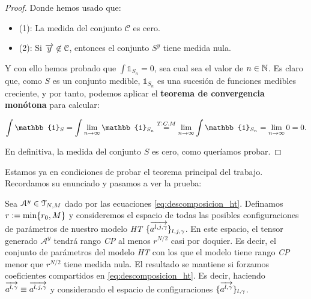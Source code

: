 \begin{proof}
    Donde hemos usado que:

    \begin{itemize}
        \item (1): La medida del conjunto $\mathcal{C}$ es cero.
        \item (2): Si $\overrightarrow{y} \not\in \mathcal{C}$, entonces el conjunto $S^{y}$ tiene medida nula.
    \end{itemize}

    Y con ello hemos probado que $\int \mathbb{1}_{S_n} = 0$, sea cual sea el valor de $n \in \mathbb{N}$. Es claro que, como $S$ es un conjunto medible, $\mathbb{1}_{S_n}$ es una sucesión de funciones medibles creciente, y por tanto, podemos aplicar el \textbf{teorema de convergencia monótona} para calcular:

    \begin{equation}
        \int \mathbb{1}_S = \int \lim_{n \to \infty} \mathbb{1}_{S_n} \encima{=}{T.C.M} \lim_{n \to \infty} \int \mathbb{1}_{S_n} = \lim_{n \to \infty} 0 = 0.
    \end{equation}

    En definitiva, la medida del conjunto $S$ es cero, como queríamos probar.

\end{proof}

Estamos ya en condiciones de probar el teorema principal del trabajo. Recordamos su enunciado y pasamos a ver la prueba:

\begin{teorema} \label{teorema:teorema_principal_especificacion}
    Sea $\mathcal{A}^y \in \mathcal{T}_{N, M}$ dado por las ecuaciones \eqref{eq:descomposicion_ht}. Definamos $r := \min \{ r_0, M \}$ y consideremos el espacio de todas las posibles configuraciones de parámetros de nuestro modelo \textit{HT} $\{  \overrightarrow{a^{l, j, \gamma}} \}_{l, j, \gamma}$. En este espacio, el tensor generado $\mathcal{A}^y$ tendrá rango \textit{CP} al menos $r^{N/2}$ casi por doquier. Es decir, el conjunto de parámetros del modelo \textit{HT} con los que el modelo tiene rango \textit{CP} menor que $r^{N/2}$ tiene medida nula. El resultado se mantiene si forzamos coeficientes compartidos en \eqref{eq:descomposicion_ht}. Es decir, haciendo $\overrightarrow{a^{l, \gamma}} \equiv \overrightarrow{a^{l, j, \gamma}}$ y considerando el espacio de configuraciones $\{ \overrightarrow{a^{l, \gamma}}  \}_{l, \gamma}$.
\end{teorema}

